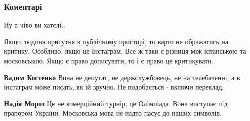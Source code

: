  
 
 
 
 
\subsubsection{Коментарі}

\begin{itemize}
 
Ну а чіво ви хатєлі..\Laughey[1.0][white]

 

Якщо людина присутня в публічному просторі, то варто не ображатись на критику.
Особливо, якщо це Інстаграм. Все ж таки є різниця між іспанською та
московською. Якщо є право дописувати, то і є право це критикувати.

\begin{itemize}
 
\textbf{Вадим Костенко} Вона не депутат, не держслужбовець, не на телебаченні,
а в інстаграм може писать, як їй зручно. Не подобається - включи переклад.

\begin{itemize}
 
\textbf{Надія Мороз} Це не комерційний турнір, це Олімпіада. Вона виступає під прапором України. Московська мова не надто пасує до наших символів.
\end{itemize}


\end{itemize}
\end{itemize}
